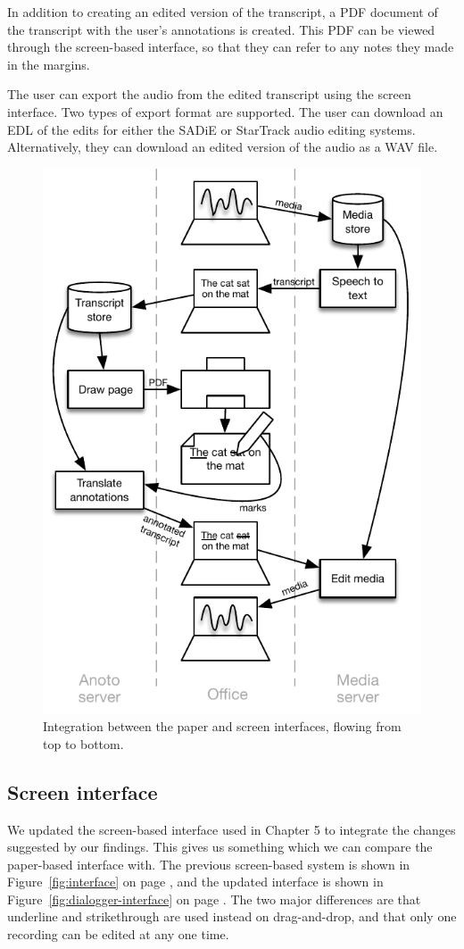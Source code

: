 In addition to creating an edited version of the transcript, a PDF document of the transcript with the user's
annotations is created. This PDF can be viewed through the screen-based interface, so that they can refer to any notes
they made in the margins.

The user can export the audio from the edited transcript using the screen interface. Two types of export format are
supported. The user can download an EDL of the edits for either the SADiE or StarTrack audio editing systems.
Alternatively, they can download an edited version of the audio as a WAV file.

\begin{figure}[ht]
  \centering
  \includegraphics[width=0.5\columnwidth]{figs/uist-sys-diagram}
  \caption{Integration between the paper and screen interfaces, flowing from top to bottom.}
  \label{fig:paper-screen-integration}
\end{figure}

\subsection{Screen interface}
We updated the screen-based interface used in Chapter 5 to integrate the changes suggested by our findings. This gives
us something which we can compare the paper-based interface with.
The previous screen-based system is shown in Figure~\ref{fig:interface} on page \pageref{fig:interface}, and the
updated interface is shown in Figure~\ref{fig:dialogger-interface} on page \pageref{fig:dialogger-interface}.
The two major differences are that underline and strikethrough are used instead on drag-and-drop, and that only one
recording can be edited at any one time.

